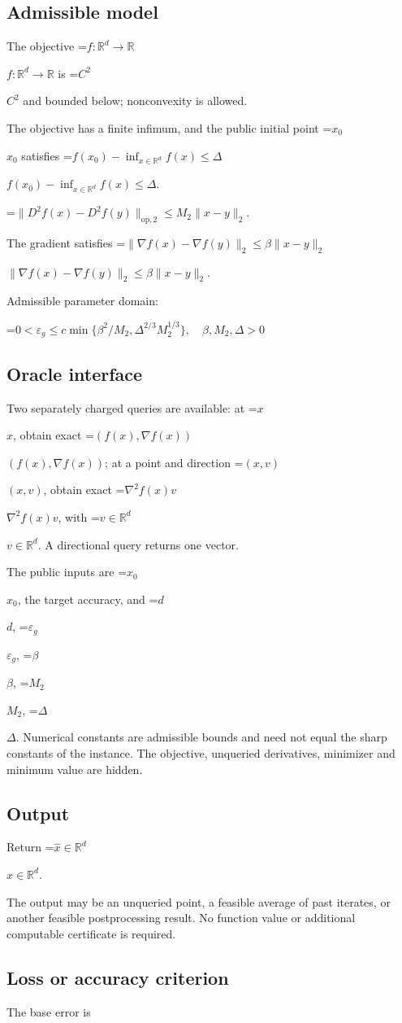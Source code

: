 \documentclass[10pt,a4paper]{article}
\newcommand{\AtlasMath}[1]{\par\begingroup\centering\setbox0=\hbox{$\displaystyle #1$}\ifdim\wd0>1.4\linewidth\typeout{ATLAS WIDE FORMULA: \the\wd0}\fi\ifdim\wd0>\linewidth\resizebox{\linewidth}{!}{\box0}\else\box0\fi\par\endgroup}
\newcommand{\AtlasInlineMath}[1]{\begingroup\setbox0=\hbox{$#1$}\ifdim\wd0>.4\linewidth\endgroup\AtlasMath{#1}\else\endgroup$#1$\fi}
\begin{document}
\subsection{Admissible model}
The objective \AtlasInlineMath{f:\mathbb{R}^d\to\mathbb{R}} is \AtlasInlineMath{C^2} and bounded below; nonconvexity is allowed.

The objective has a finite infimum, and the public initial point \AtlasInlineMath{x_0} satisfies \AtlasInlineMath{f(x_0)-\inf_{x\in \mathbb{R}^d}f(x)\le\Delta}.


\AtlasMath{\|D^{2}f(x)-D^{2}f(y)\|_{\mathrm{op},2}\le M_2\|x-y\|_{2}.}


The gradient satisfies \AtlasInlineMath{\|\nabla f(x)-\nabla f(y)\|_2\le\beta\|x-y\|_2}.

Admissible parameter domain:


\AtlasMath{0<\varepsilon_g\le c\min\{\beta^2/M_2,\Delta^{2/3}M_2^{1/3}\},\quad\beta,M_2,\Delta>0}


\subsection{Oracle interface}
Two separately charged queries are available: at \AtlasInlineMath{x}, obtain exact \AtlasInlineMath{(f(x),\nabla f(x))}; at a point and direction \AtlasInlineMath{(x,v)}, obtain exact \AtlasInlineMath{\nabla^2f(x)v}, with \AtlasInlineMath{v\in\mathbb{R}^d}. A directional query returns one vector.

The public inputs are \AtlasInlineMath{x_0}, the target accuracy, and \AtlasInlineMath{d}, \AtlasInlineMath{\varepsilon_g}, \AtlasInlineMath{\beta}, \AtlasInlineMath{M_2}, \AtlasInlineMath{\Delta}. Numerical constants are admissible bounds and need not equal the sharp constants of the instance. The objective, unqueried derivatives, minimizer and minimum value are hidden.

\subsection{Output}
Return \AtlasInlineMath{\widehat{x}\in \mathbb{R}^d}.

The output may be an unqueried point, a feasible average of past iterates, or another feasible postprocessing result. No function value or additional computable certificate is required.

\subsection{Loss or accuracy criterion}
The base error is
\end{document}

